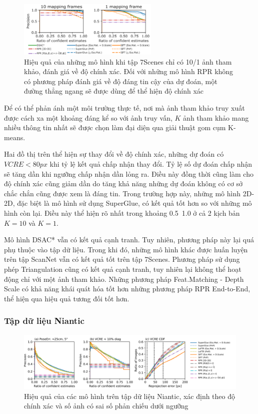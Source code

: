 \begin{figure}[H]
  \centering
  \includegraphics[width=0.6\textwidth]{pics/Proposal/partial_7scene.png}
  \caption[Hiệu quả của các mô hình khi giới hạn ảnh tham khảo]{Hiệu quả của những mô hình khi tập 7Scenes chỉ có 10/1 ảnh tham khảo, đánh giá về độ chính xác. Đối với những mô hình RPR không có phương pháp đánh giá về độ đáng tin cậy của dự đoán, một đường thẳng ngang sẽ được dùng để thể hiện độ chính xác}
\end{figure}

Để có thể phản ánh một môi trường thực tế, nơi mà ảnh tham khảo truy xuất được cách xa một khoảng đáng kể so với ảnh truy vấn, $K$ ảnh tham khảo mang nhiều thông tin nhất sẽ được chọn làm đại diện qua giải thuật gom cụm K-means.

Hai đồ thị trên thể hiện sự thay đổi về độ chính xác, những dự đoán có $VCRE<80px$ khi tỷ lệ kết quả chấp nhận thay đổi. Tỷ lệ số dự đoán chấp nhận sẽ tăng dần khi ngưỡng chấp nhận dần lỏng ra. Điều này đồng thời cũng làm cho độ chính xác cũng giảm dần do tăng khả năng những dự đoán không có cơ sở chắc chắn cũng được xem là đáng tin. Trong trường hợp này, những mô hình 2D-2D, đặc biệt là mô hình sử dụng SuperGlue, có kết quả tốt hơn so với những mô hình còn lại. Điều này thể hiện rõ nhất trong khoảng 0.5~1.0 ở cả 2 kịch bản $K=10$ và $K=1$.

Mô hình DSAC* vẫn có kết quả cạnh tranh. Tuy nhiên, phương pháp này lại quá phụ thuộc vào tập dữ liệu. Trong khi đó, những mô hình khác được huấn luyện trên tập ScanNet vẫn có kết quả tốt trên tập 7Scenes. Phương pháp sử dụng phép Triangulation cũng có kết quả cạnh tranh, tuy nhiên lại không thể hoạt động chỉ với một ảnh tham khảo. Những phương pháp Feat.Matching - Depth Scale có khả năng khái quát hóa tốt hơn những phương pháp RPR End-to-End, thể hiện qua hiệu quả tương đối tốt hơn.

\subsubsection{Tập dữ liệu Niantic}

\begin{figure}[H]
  \centering
  \includegraphics[width=\textwidth]{pics/Proposal/all_niantic.png}
  \caption{Hiệu quả của các mô hình trên tập dữ liệu Niantic, xác định theo độ chính xác và số ảnh có sai số phản chiếu dưới ngưỡng}
\end{figure}

